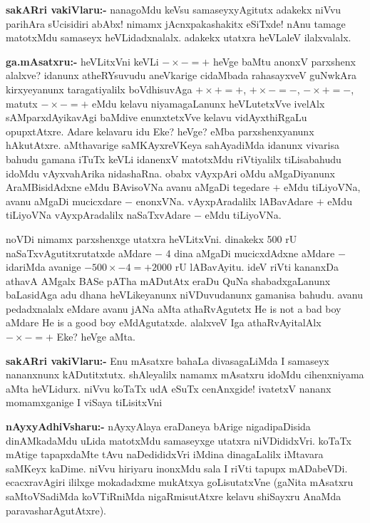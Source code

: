 \smallskip
\noindent
\textbf{sakARri vakiVlaru:-} nanagoMdu keVsu samaseyxyAgitutx adakekx niVvu parihAra sUcisidiri abAbx! nimamx jAcnxpakashakitx eSiTxde! nAnu tamage matotxMdu samaseyx heVLidadxnalalx. adakekx utatxra heVLaleV ilalxvalalx.

\smallskip
\noindent
\textbf{ga.mAsatxru:-} heVLitxVni keVLi $-\times -=+$ heVge baMtu anonxV parxshenx alalxve? idanunx atheRYsuvudu aneVkarige cidaMbada rahasayxveV guNwkAra kirxyeyanunx taragatiyalilx boVdhisuvAga $+\times +=+$, \quad $+\times -=-$, \quad $-\times +=-$, matutx $-\times -=+$ eMdu kelavu niyamagaLanunx heVLutetxVve ivelAlx sAMparxdAyikavAgi baMdive enunxtetxVve kelavu vidAyxthiRgaLu opupxtAtxre. Adare kelavaru idu Eke? heVge? eMba parxshenxyanunx hAkutAtxre. aMthavarige saMKAyxreVKeya sahAyadiMda idanunx vivarisa bahudu gamana iTuTx keVLi idanenxV matotxMdu riVtiyalilx tiLisabahudu idoMdu vAyxvahArika nidashaRna. obabx vAyxpAri oMdu aMgaDiyanunx AraMBisidAdxne eMdu BAvisoVNa avanu aMgaDi tegedare $+$ eMdu tiLiyoVNa, avanu aMgaDi mucicxdare $-$ enonxVNa. vAyxpAradalilx lABavAdare $+$ eMdu tiLiyoVNa vAyxpAradalilx naSaTxvAdare $-$ eMdu tiLiyoVNa.

noVDi nimamx parxshenxge utatxra heVLitxVni. dinakekx {\rm 500} rU naSaTxvAgutitxrutatxde aMdare $-$ {\rm 4} dina aMgaDi mucicxdAdxne aMdare $-$ idariMda avanige $-500\times -4=+2000$ rU lABavAyitu. ideV riVti kananxDa athavA AMgalx BASe pATha mADutAtx eraDu QuNa shabadxgaLanunx baLasidAga adu dhana heVLikeyanunx niVDuvudanunx gamanisa bahudu. avanu pedadxnalalx eMdare avanu jANa aMta athaRvAgutetx {\rm He is not a bad boy} aMdare {\rm He is a good boy} eMdAgutatxde. alalxveV Iga athaRvAyitalAlx $-\times -=+$ Eke? heVge aMta.

\smallskip
\noindent
\textbf{sakARri vakiVlaru:-} Enu mAsatxre bahaLa divasagaLiMda I samaseyx nananxnunx kADutitxtutx. shAleyalilx namamx mAsatxru idoMdu cihenxniyama aMta heVLidurx. niVvu koTaTx udA eSuTx cenAnxgide! ivatetxV nananx momamxganige I viSaya tiLisitxVni

\smallskip
\noindent
\textbf{nAyxyAdhiVsharu:-} nAyxyAlaya eraDaneya bArige nigadipaDisida dinAMkadaMdu uLida matotxMdu samaseyxge utatxra niVDididxVri. koTaTx mAtige tapapxdaMte tAvu naDedididxVri iMdina dinagaLalilx iMtavara saMKeyx kaDime. niVvu hiriyaru inonxMdu sala I riVti tapupx mADabeVDi. ecacxravAgiri ililxge mokadadxme mukAtxya goLisutatxVne (gaNita mAsatxru saMtoVSadiMda koVTiRniMda nigaRmisutAtxre kelavu shiSayxru AnaMda paravasharAgutAtxre).
